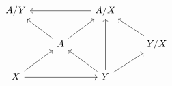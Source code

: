 \documentclass[crop,dvisvgm]{standalone}
\begin{document}
\[\begin {tikzcd}
      A/Y
      && A/X
        \ar [ll]
    \\& A
        \ar [ul] \ar [ur]
      && Y/X
        \ar [ul]
    \\X
        \ar [rr] \ar [ur]
      && Y
        \ar [ul] \ar [uu] \ar [ur]
    \end {tikzcd}\]
\end{document}
